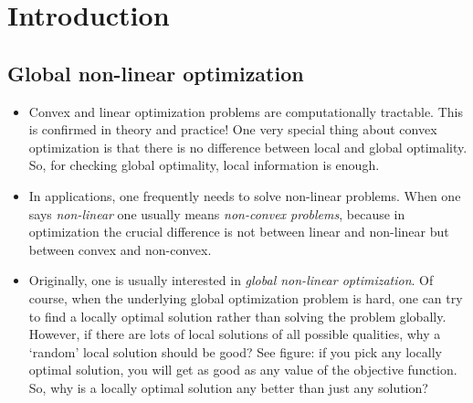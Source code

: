\clearpage 

\section{Introduction}



\subsection{Global non-linear optimization} 

\begin{itemize}
	\item Convex and linear optimization problems are computationally tractable. This is confirmed in theory and practice! One very special thing about convex optimization is that there is no difference between local and global optimality. So, for checking global optimality, local information is enough.
	\item In applications, one frequently needs to solve non-linear problems. When one says \emph{non-linear} one usually means \emph{non-convex problems}, because in optimization the crucial difference is not between linear and non-linear but between convex and non-convex.
	\item Originally, one is usually interested in \emph{global non-linear optimization}. Of course, when the underlying global optimization problem is hard, one can try to find a locally optimal solution rather than solving the problem globally. However, if there are lots of local solutions of all possible qualities, why a `random' local solution should be good?  See figure: if you pick any locally optimal solution, you will get as good as any value of the objective function. So, why is a locally optimal solution any better than just any solution?
	\begin{center}
	\end{center}

\end{itemize}
